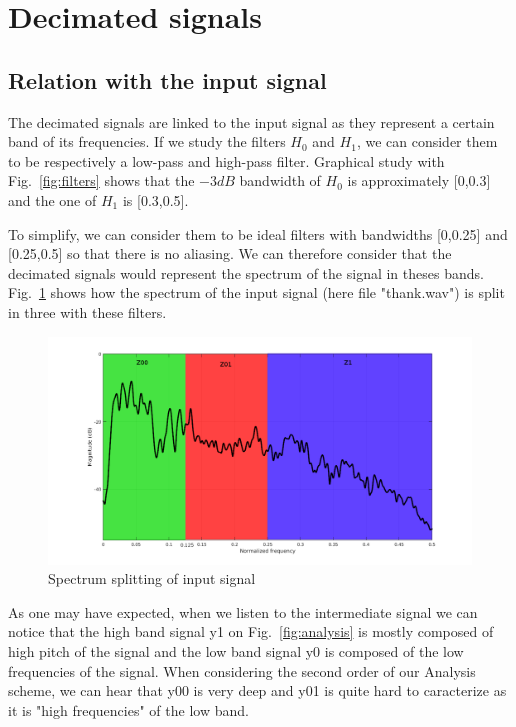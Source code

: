 \documentclass[a4paper,twocolumn]{article}
\begin{document}
\section{Decimated signals}
\label{sec:decimated}

\subsection{Relation with the input signal}
The decimated signals are linked to the input signal as they represent a certain band of its frequencies. If we study the filters $H_{0}$ and $H_{1}$, we can consider them to be respectively a low-pass and high-pass filter. Graphical study with Fig.~\ref{fig:filters} shows that the $-3dB$ bandwidth of $H_{0}$ is approximately [0,0.3] and the one of $H_{1}$ is [0.3,0.5]. 

To simplify, we can consider them to be ideal filters with bandwidths [0,0.25] and [0.25,0.5] so that there is no aliasing. We can therefore consider that the decimated signals would represent the spectrum of the signal in theses bands. Fig.~\ref{fig:spect} shows how the spectrum of the input signal (here file "thank.wav") is split in three with these filters.

\begin{figure}[!ht]
  \begin{center}
    \includegraphics[width=1.1\columnwidth]{Thank_spectrum5.png}
  \end{center}
  \caption{Spectrum splitting of input signal}
  \label{fig:spect}
\end{figure}
As one may have expected, when we listen to the intermediate signal we can notice that the high band signal y1 on Fig.~\ref{fig:analysis} is mostly composed of high pitch of the signal and the low band signal y0 is composed of the low frequencies of the signal. When considering the second order of our Analysis scheme, we can hear that y00 is very deep and y01 is quite hard to caracterize as it is "high frequencies" of the low band.
\end{document}
